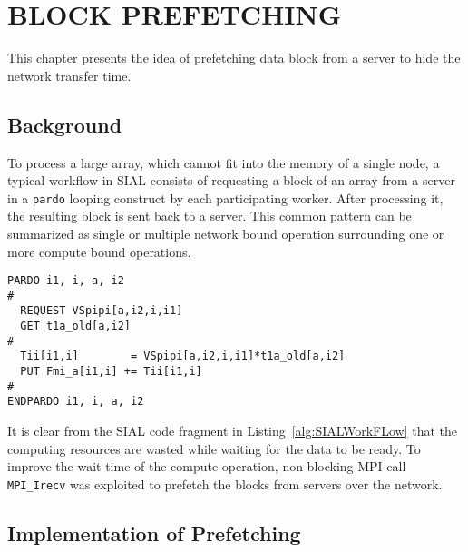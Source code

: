\chapter{BLOCK PREFETCHING}\label{block prefetching}

This chapter presents the idea of prefetching data block from a server to hide the
network transfer time.

\section{Background}\label{prefetchingbackground}
To process a large array, which cannot fit into the memory of a single node, a typical
workflow in SIAL consists of requesting a block of an array from a server in a
\texttt{pardo} looping construct by each participating worker. After processing
it, the resulting block is sent back to a server. This common pattern can be
summarized as single or multiple network bound operation surrounding one or more
compute bound operations.

\begin{lstlisting}[caption={Code Fragment from ACESIII for CCSD calculation},
  label={alg:SIALWorkFLow}]
PARDO i1, i, a, i2
#
  REQUEST VSpipi[a,i2,i,i1]
  GET t1a_old[a,i2]
#
  Tii[i1,i]        = VSpipi[a,i2,i,i1]*t1a_old[a,i2]
  PUT Fmi_a[i1,i] += Tii[i1,i]
#
ENDPARDO i1, i, a, i2
\end{lstlisting}

It is clear from the SIAL code fragment in Listing~\ref{alg:SIALWorkFLow} that the computing resources are wasted while
waiting for the data to be ready. To improve the wait time of the compute
operation, non-blocking MPI call \texttt{MPI\_Irecv} was exploited to prefetch
the blocks from servers over the network.

\section{Implementation of Prefetching}

